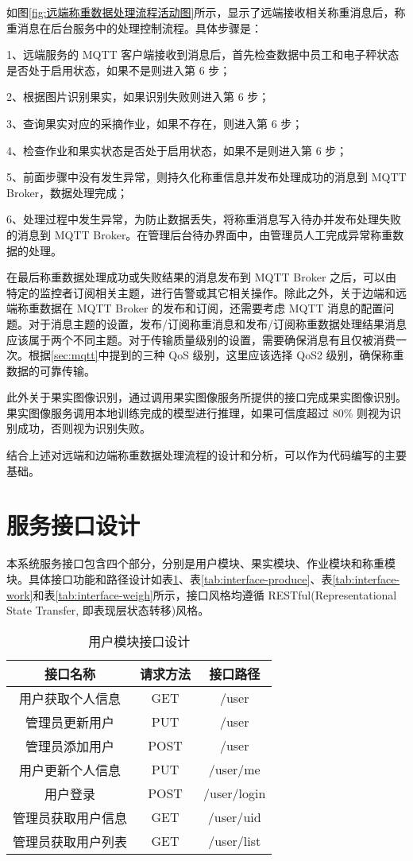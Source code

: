 如图\ref{fig:远端称重数据处理流程活动图}所示，显示了远端接收相关称重消息后，称重消息在后台服务中的处理控制流程。具体步骤是：

1、远端服务的 MQTT 客户端接收到消息后，首先检查数据中员工和电子秤状态是否处于启用状态，如果不是则进入第 6 步；

2、根据图片识别果实，如果识别失败则进入第 6 步；

3、查询果实对应的采摘作业，如果不存在，则进入第 6 步；

4、检查作业和果实状态是否处于启用状态，如果不是则进入第 6 步；

5、前面步骤中没有发生异常，则持久化称重信息并发布处理成功的消息到 MQTT Broker，数据处理完成；

6、处理过程中发生异常，为防止数据丢失，将称重消息写入待办并发布处理失败的消息到 MQTT Broker。在管理后台待办界面中，由管理员人工完成异常称重数据的处理。

在最后称重数据处理成功或失败结果的消息发布到 MQTT Broker 之后，可以由特定的监控者订阅相关主题，进行告警或其它相关操作。除此之外，关于边端和远端称重数据在 MQTT Broker 的发布和订阅，还需要考虑 MQTT 消息的配置问题。对于消息主题的设置，发布/订阅称重消息和发布/订阅称重数据处理结果消息应该属于两个不同主题。对于传输质量级别的设置，需要确保消息有且仅被消费一次。根据\ref{sec:mqtt}中提到的三种 QoS 级别，这里应该选择 QoS2 级别，确保称重数据的可靠传输。

此外关于果实图像识别，通过调用果实图像服务所提供的接口完成果实图像识别。果实图像服务调用本地训练完成的模型进行推理，如果可信度超过 80\% 则视为识别成功，否则视为识别失败。

结合上述对远端和边端称重数据处理流程的设计和分析，可以作为代码编写的主要基础。

\section{服务接口设计}\label{sec:service}

本系统服务接口包含四个部分，分别是用户模块、果实模块、作业模块和称重模块。具体接口功能和路径设计如表\ref{tab:interface-user}、表\ref{tab:interface-produce}、表\ref{tab:interface-work}和表\ref{tab:interface-weigh}所示，接口风格均遵循 RESTful(Representational State Transfer, 即表现层状态转移)风格。

\begin{table}[H]
\centering
\caption{用户模块接口设计}
\label{tab:interface-user}
\begin{tabular}{|c|c|c|}
\hline
接口名称 & 请求方法 & 接口路径 \\ \hline
用户获取个人信息 & GET & /user \\ \hline
管理员更新用户 & PUT & /user \\ \hline
管理员添加用户 & POST & /user \\ \hline
用户更新个人信息 & PUT & /user/me \\ \hline
用户登录 & POST & /user/login \\ \hline
管理员获取用户信息 & GET & /user/{uid} \\ \hline
管理员获取用户列表 & GET & /user/list \\ \hline
\end{tabular}
\end{table}

